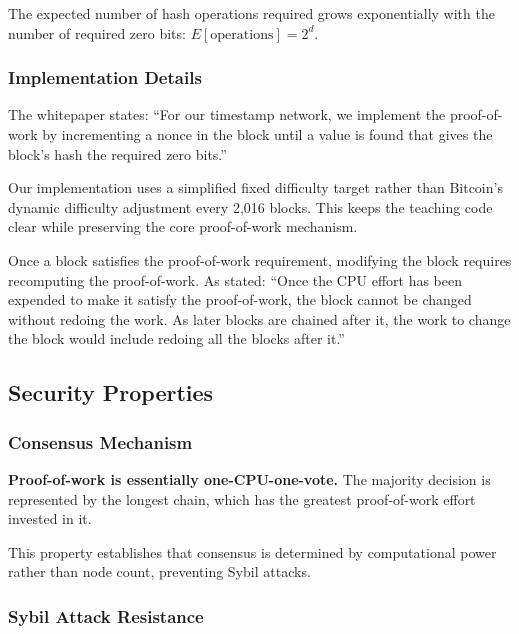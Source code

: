 The expected number of hash operations required grows exponentially with the number of required zero bits: $E[\text{operations}] = 2^d$.

\subsubsection{Implementation Details}

The whitepaper states: ``For our timestamp network, we implement the proof-of-work by incrementing a nonce in the block until a value is found that gives the block's hash the required zero bits.''

\begin{notebox}
Our implementation uses a simplified fixed difficulty target rather than Bitcoin's dynamic difficulty adjustment every 2,016 blocks. This keeps the teaching code clear while preserving the core proof-of-work mechanism.
\end{notebox}

Once a block satisfies the proof-of-work requirement, modifying the block requires recomputing the proof-of-work. As stated: ``Once the CPU effort has been expended to make it satisfy the proof-of-work, the block cannot be changed without redoing the work. As later blocks are chained after it, the work to change the block would include redoing all the blocks after it.''

\subsection{Security Properties}
\label{subsec:pow-security}

\subsubsection{Consensus Mechanism}

\textbf{Proof-of-work is essentially one-CPU-one-vote.} The majority decision is represented by the longest chain, which has the greatest proof-of-work effort invested in it.

This property establishes that consensus is determined by computational power rather than node count, preventing Sybil attacks.

\subsubsection{Sybil Attack Resistance}

